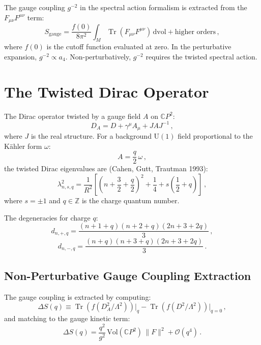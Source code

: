 \documentclass[11pt,a4paper]{article}
\newcommand{\Tr}{\operatorname{Tr}}
\newcommand{\CP}{\mathbb{C}P}
\begin{document}
The gauge coupling $g^{-2}$ in the spectral action formalism is extracted from the $F_{\mu\nu}F^{\mu\nu}$ term:
\begin{equation}
S_{\mathrm{gauge}} = \frac{f(0)}{8\pi^2}\int_M \Tr(F_{\mu\nu}F^{\mu\nu})\,\mathrm{dvol} + \text{higher orders}\,,
\end{equation}
where $f(0)$ is the cutoff function evaluated at zero. In the perturbative expansion, $g^{-2} \propto a_4$. Non-perturbatively, $g^{-2}$ requires the twisted spectral action.

\section{The Twisted Dirac Operator}

The Dirac operator twisted by a gauge field $A$ on $\CP^2$:
\begin{equation}
D_A = D + \gamma^\mu A_\mu + J A J^{-1}\,,
\end{equation}
where $J$ is the real structure. For a background $\mathrm{U}(1)$ field proportional to the K\"ahler form $\omega$:
\begin{equation}
A = \frac{q}{2}\,\omega\,,
\end{equation}
the twisted Dirac eigenvalues are (Cahen, Gutt, Trautman 1993):
\begin{equation}
\lambda_{n,s,q}^2 = \frac{1}{R^2}\left[\left(n + \frac{3}{2} + \frac{q}{2}\right)^2 + \frac{1}{4} + s\left(\frac{1}{2} + q\right)\right]\,,
\end{equation}
where $s = \pm 1$ and $q \in \mathbb{Z}$ is the charge quantum number.

The degeneracies for charge $q$:
\begin{equation}
d_{n,+,q} = \frac{(n + 1 + q)(n + 2 + q)(2n + 3 + 2q)}{3}\,,
\end{equation}
\begin{equation}
d_{n,-,q} = \frac{(n + q)(n + 3 + q)(2n + 3 + 2q)}{3}\,.
\end{equation}

\subsection{Non-Perturbative Gauge Coupling Extraction}

The gauge coupling is extracted by computing:
\begin{equation}
\Delta S(q) \equiv \Tr(f(D_A^2/\Lambda^2))\bigg|_q - \Tr(f(D^2/\Lambda^2))\bigg|_{q=0}\,,
\end{equation}
and matching to the gauge kinetic term:
\begin{equation}
\Delta S(q) = \frac{q^2}{g^2}\,\mathrm{Vol}(\CP^2)\,\|F\|^2 + \mathcal{O}(q^4)\,.
\end{equation}
\end{document}

